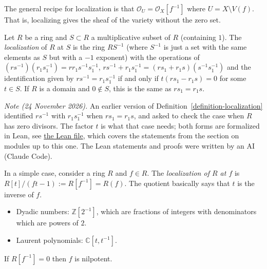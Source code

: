 \noindent
The general recipe for localization is that
$\mathcal{O}_U=\mathcal{O}_X[f^{-1}]$ where
$U=X\setminus V(f)$.
That is, localizing gives the sheaf of the
variety without the zero set.

\begin{definition}
\label{definition-localization}
Let $R$ be a ring and $S \subset R$
a multiplicative subset of $R$ (containing
$1$).
The {\it localization} of $R$ at $S$
is the ring $RS^{-1}$
(where $S^{-1}$ is just a set with
the same elements as $S$ but with a $-1$
exponent)
with the operations of
$(rs^{-1})(r_1s_1^{-1})=rr_1s^{-1}s_1^{-1}$,
$rs^{-1}+r_1s_1^{-1}=(rs_1+r_1s)(s^{-1}s^{-1}
_1)$
and the identification given by
$rs^{-1}=r_1s_1^{-1}$ if and only if
$t(rs_1-r_1s)=0$ for some $t \in S$.
If $R$ is a domain and $0 \notin S$,
this is the same as $rs_1=r_1s$.
\end{definition}

\medskip\noindent
{\it Note (24 November 2026).}
An earlier version of
Definition~\ref{definition-localization}
identified $rs^{-1}$ with $r_1s_1^{-1}$
when $rs_1=r_1s$, and asked to check
the case when $R$ has zero divisors.
The factor $t$ is what that case needs;
both forms are formalized in Lean, see
\href{https://github.com/danimalabares/%
heap-project/blob/main/lean/HeapProject/%
CommutativeAlgebra/Foundations.lean}
{the Lean file},
which covers the statements from the section
on modules up to this one.
The Lean statements and proofs
were written by an AI (Claude Code).

\noindent
In a simple case, consider a ring $R$ and $f
\in R$.
The {\it localization of $R$ at $f$}
is $R[t]/(ft-1):=R[f^{-1}]=R(f)$.
The quotient basically says that $t$ is the
inverse of $f$.

\begin{example}
\label{example-localization}
\begin{itemize}
\item Dyadic numbers: $\mathbb{Z}[2^{-1}]$,
which are fractions of integers with
denominators which
are powers of $2$.

\item Laurent polynomials:
$\mathbb{C}[t,t^{-1}]$.
\end{itemize}
\end{example}

\begin{lemma}
\label{lemma-localization-nilpotent}
If $R[f^{-1}]=0$ then $f$ is nilpotent.
\end{lemma}

